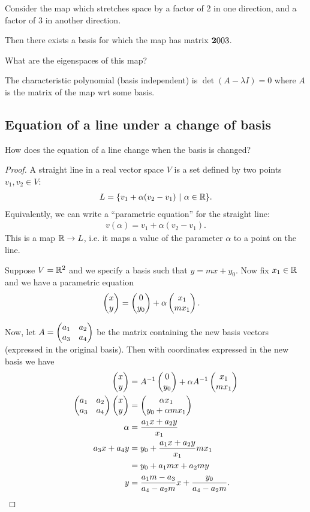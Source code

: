 
\newpage
Consider the map which stretches space by a factor of 2 in one direction, and a
factor of 3 in another direction.

Then there exists a basis for which the map has matrix
$
\mathbf{2}{0}
    {0}{3}
$.

What are the eigenspaces of this map?

The characteristic polynomial (basis independent) is $\det(A - \lambda I) = 0$
where $A$ is the matrix of the map wrt some basis.


\subsection{Equation of a line under a change of basis} \label{equation-of-line-under-change-of-basis}
\begin{question*}
  How does the equation of a line change when the basis is changed?
\end{question*}

\begin{proof}
  A straight line in a real vector space $V$ is a set defined by two points $v_1, v_2 \in V$:
  \begin{align*}
    L = \{v_1 + \alpha(v_2 - v_1) ~|~ \alpha \in \mathbb{R} \}.
  \end{align*}
  Equivalently, we can write a ``parametric equation'' for the straight line:
  \begin{align*}
    v(\alpha) = v_1 + \alpha(v_2 - v_1).
  \end{align*}
  This is a map $\mathbb{R} \to L$, i.e. it maps a value of the parameter $\alpha$ to a point on the line.

  Suppose $V = \mathbb{R}^2$ and we specify a basis such that $y = mx + y_0$. Now fix $x_1 \in \mathbb{R}$ and we
  have a parametric equation
  \begin{align*}
    \begin{pmatrix}x\\y\end{pmatrix} &= \begin{pmatrix}0\\y_0\end{pmatrix} + \alpha\begin{pmatrix}x_1\\mx_1\end{pmatrix}.
  \end{align*}

  Now, let $A = \begin{pmatrix}a_1 & a_2\\a_3 & a_4\\ \end{pmatrix}$ be the matrix containing the new basis vectors
  (expressed in the original basis). Then with coordinates expressed in the new basis we have
  \begin{align*}
    \begin{pmatrix}x\\y\end{pmatrix}                    &= A^{-1}\begin{pmatrix}0\\y_0\end{pmatrix} + \alpha A^{-1}\begin{pmatrix}x_1\\mx_1\end{pmatrix} \\
    \begin{pmatrix}a_1 & a_2\\a_3 & a_4\\ \end{pmatrix}\begin{pmatrix}x\\y\end{pmatrix} &= \begin{pmatrix}\alpha x_1\\y_0 + \alpha mx_1\end{pmatrix} \\
    \alpha &= \frac{a_1x + a_2y}{x_1} \\
    a_3x + a_4y &= y_0 + \frac{a_1x + a_2y}{x_1} mx_1 \\
                &= y_0 + a_1mx + a_2my \\
    y &= \frac{a_1m - a_3}{a_4 - a_2m}x + \frac{y_0}{a_4 - a_2m}.
  \end{align*}
\end{proof}

